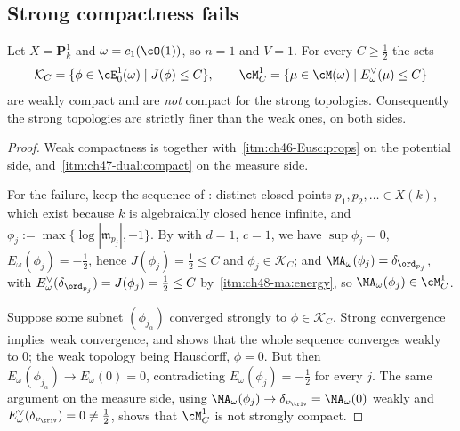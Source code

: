 \subsection{Strong compactness fails}
\label{sec:ch48-no-strong-compactness}

\begin{proposition}
\label{prop:ch48-no-strong-compactness}
Let $X=\mathbf P^1_k$ and $\omega=c_1(\cO(1))$, so $n=1$ and
$V=1$.  For every $C\ge\tfrac12$ the sets
\[
 \mathcal K_C=\{\phi\in\cE^1_0(\omega)\mid J(\phi)\le C\},
 \qquad
 \cM^1_C=\{\mu\in\cM(\omega)\mid E^\vee_\omega(\mu)\le C\}
\]
are weakly compact and are \emph{not} compact for the strong topologies.
Consequently the strong topologies are strictly finer than the weak ones,
on both sides.
\end{proposition}

\begin{proof}
Weak compactness is  together with
\,\cref{itm:ch46-Eusc:props} on the potential
side, and
\,\cref{itm:ch47-dual:compact} on the
measure side.

For the failure, keep the sequence of
: distinct closed points
$p_1,p_2,\dots\in X(k)$, which exist because $k$ is algebraically
closed hence infinite, and
$\phi_j:=\max\{\log|\mathfrak m_{p_j}|,-1\}$.  By
 with $d=1$, $c=1$, we have
$\sup\phi_j=0$, $E_\omega(\phi_j)=-\tfrac12$, hence
$J(\phi_j)=\tfrac12\le C$ and $\phi_j\in\mathcal K_C$; and
$\MA_\omega(\phi_j)=\delta_{\ord_{p_j}}$, with
$E^\vee_\omega(\delta_{\ord_{p_j}})=J(\phi_j)=\tfrac12\le C$ by
\,\cref{itm:ch48-ma:energy}, so
$\MA_\omega(\phi_j)\in\cM^1_C$.

Suppose some subnet $(\phi_{j_\alpha})$ converged strongly to
$\phi\in\mathcal K_C$.  Strong convergence implies weak convergence, and
 shows that the whole sequence
converges weakly to $0$; the weak topology being Hausdorff, $\phi=0$.
But then $E_\omega(\phi_{j_\alpha})\to E_\omega(0)=0$, contradicting
$E_\omega(\phi_j)=-\tfrac12$ for every $j$.  The same argument on the
measure side, using
$\MA_\omega(\phi_j)\to\delta_{v_{\triv}}=\MA_\omega(0)$ weakly and
$E^\vee_\omega(\delta_{v_{\triv}})=0\ne\tfrac12$, shows that
$\cM^1_C$ is not strongly compact.
\end{proof}

